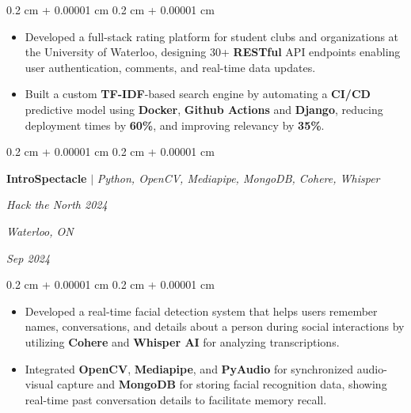 \documentclass[10pt, letterpaper]{article}
\newenvironment{highlights}{
    \begin{itemize}[
        topsep=0.10 cm,
        parsep=0.10 cm,
        partopsep=0pt,
        itemsep=0pt,
        leftmargin=0.4 cm + 10pt
    ]
}{
    \end{itemize}
} %
\newenvironment{onecolentry}{
    \begin{adjustwidth}{
        0.2 cm + 0.00001 cm
    }{
        0.2 cm + 0.00001 cm
    }
}{
    \end{adjustwidth}
} %
\newenvironment{twocolentry}[2][]{
    \onecolentry
    \def\secondColumn{#2}
    \setcolumnwidth{\fill, 4.5 cm}
    \begin{paracol}{2}
}{
    \switchcolumn \raggedleft \secondColumn
    \end{paracol}
    \endonecolentry
} %
\let\hrefWithoutArrow\href
\renewcommand{\href}[2]{\hrefWithoutArrow{#1}{\ifthenelse{\equal{#2}{}}{ }{#2 }\raisebox{.15ex}{\footnotesize \faExternalLink*}}}
\begin{document}
        \vspace{0.10 cm}
        \begin{onecolentry}
            \begin{highlights}
                \item Developed a full-stack rating platform for student clubs and organizations at the University of Waterloo, designing 30+ \textbf{RESTful} API endpoints enabling user authentication, comments, and real-time data updates.
                \item Built a custom \textbf{TF-IDF}-based search engine by automating a \textbf{CI/CD} predictive model using \textbf{Docker}, \textbf{Github Actions} and \textbf{Django}, reducing deployment times by \textbf{60\%}, and improving relevancy by \textbf{35\%}.
                
            \end{highlights}
        \end{onecolentry}

        \vspace{0.2 cm}

       \begin{twocolentry}{
         \textit{Waterloo, ON}    
            
        \textit{Sep 2024}}
            \textbf{\textbf{IntroSpectacle }}\mbox{\hrefWithoutArrow{https://github.com/vinny-nguyen/IntroSpectacle}{\color{black}{\footnotesize\faGithub}}}
            $|$ \emph{Python, OpenCV, Mediapipe, MongoDB, Cohere, Whisper}
            
            \textit{Hack the North 2024}
        \end{twocolentry}
        
        \vspace{0.10 cm}
        \begin{onecolentry}
            \begin{highlights}
                \item Developed a real-time facial detection system that helps users remember names, conversations, and details about a person during social interactions by utilizing \textbf{Cohere} and \textbf{Whisper AI} for analyzing transcriptions.
                \item Integrated \textbf{OpenCV}, \textbf{Mediapipe}, and \textbf{PyAudio} for synchronized audio-visual capture and \textbf{MongoDB} for storing facial
recognition data, showing real-time past conversation details to facilitate memory recall.
            \end{highlights}
        \end{onecolentry}
\end{document}
